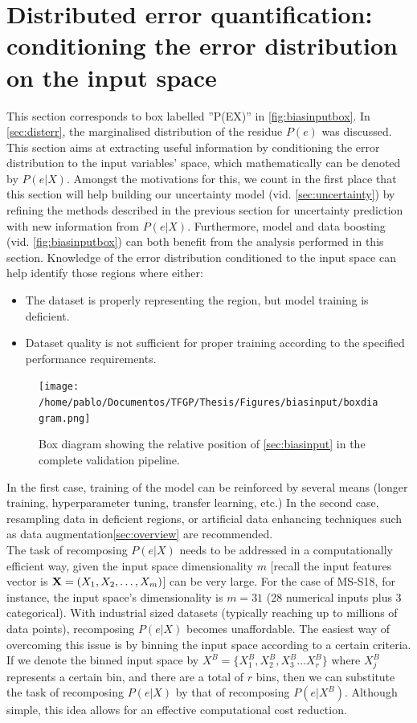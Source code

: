\section{Distributed error quantification: conditioning the error distribution on the input space}\label{sec:biasinput}
This section corresponds to box labelled ''P(E\textbar{}X)'' in \autoref{fig:biasinputbox}. In \autoref{sec:disterr}, the marginalised distribution of the residue $P(e)$ was discussed. This section aims at extracting useful information by conditioning the error distribution to the input variables' space, which mathematically can be denoted by $P(e|X)$. Amongst the motivations for this, we count in the first place that this section will help building our uncertainty model (vid. \autoref{sec:uncertainty}) by refining the methods described in the previous section for uncertainty prediction with new information from $P(e|X)$. Furthermore, model and data boosting (vid. \autoref{fig:biasinputbox}) can both benefit from the analysis performed in this section. Knowledge of the error distribution conditioned to the input space can help identify those regions where either:
\begin{itemize}
	\item The dataset is properly representing the region, but model training is deficient.
	\item Dataset quality is not sufficient for proper training according to the specified performance requirements.
\end{itemize}
\begin{figure}[!htb]
	\centering
	\texttt{[image: /home/pablo/Documentos/TFGP/Thesis/Figures/biasinput/boxdiagram.png]}
	\caption{Box diagram showing the relative position of \autoref{sec:biasinput} in the complete validation pipeline.}
	\label{fig:biasinputbox} 
\end{figure}
\indent In the first case, training of the model can be reinforced by several means (longer training, hyperparameter tuning, transfer learning, etc.) In the second case, resampling data in deficient regions, or artificial data enhancing techniques such as data augmentation\autoref{sec:overview} are recommended.\\
%
\indent The task of recomposing $P(e|X)$ needs to be addressed in a computationally efficient way, given the input space dimensionality $m$ [recall the input features vector is ${\bf X}=(X_1,X_2,\dots,X_m)$] can be very large. For the case of MS-S18, for instance, the input space's dimensionality is $m=31$ (28 numerical inputs plus 3 categorical). With industrial sized datasets (typically reaching up to millions of data points), recomposing $P(e|X)$ becomes unaffordable. The easiest way of overcoming this issue is by binning the input space according to a certain criteria. If we denote the binned input space by $X^B=\{X^B_1,X^B_2,X^B_3\ldots X^B_r\}$ where $X^B_j$ represents a certain bin, and there are a total of $r$ bins, then we can substitute the task of recomposing $P(e|X)$ by that of recomposing $P(e|X^B)$. Although simple, this idea allows for an effective computational cost reduction.\\
%
